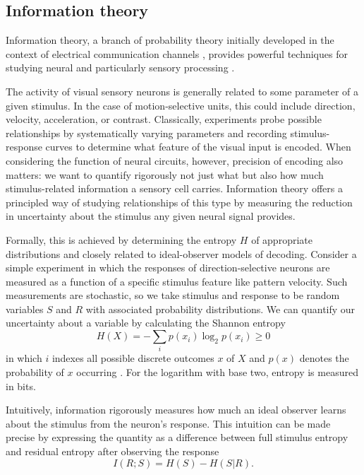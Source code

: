 \subsection{Information theory}

Information theory, a branch of probability theory initially developed in the context of electrical communication channels \citep{Shannon:1948aa}, provides powerful techniques for studying neural and particularly sensory processing \citep{Borst:1999hw}.

The activity of visual sensory neurons is generally related to some parameter of a given stimulus. In the case of motion-selective units, this could include direction, velocity, acceleration, or contrast. Classically, experiments probe possible relationships by systematically varying parameters and recording stimulus-response curves to determine what feature of the visual input is encoded. When considering the function of neural circuits, however, precision of encoding also matters: we want to quantify rigorously not just what but also how much stimulus-related information a sensory cell carries. Information theory offers a principled way of studying relationships of this type by measuring the reduction in uncertainty about the stimulus any given neural signal provides.

Formally, this is achieved by determining the entropy $H$ of appropriate distributions and closely related to ideal-observer models of decoding. Consider a simple experiment in which the responses of direction-selective neurons are measured as a function of a specific stimulus feature like pattern velocity. Such measurements are stochastic, so we take stimulus and response to be random variables $S$ and $R$ with associated probability distributions. We can quantify our uncertainty about a variable by calculating the Shannon entropy
\begin{equation}
    H(X) = - \sum_{i} p(x_i) \log_2 p(x_i) \geq 0
\end{equation}
in which $i$ indexes all possible discrete outcomes $x$ of $X$ and $p(x)$ denotes the probability of $x$ occurring \citep{Cover:2006aa}. For the logarithm with base two, entropy is measured in bits.

Intuitively, information rigorously measures how much an ideal observer learns about the stimulus from the neuron's response. This intuition can be made precise by expressing the quantity as a difference between full stimulus entropy and residual entropy after observing the response
\begin{equation}
    I(R; S) = H(S) - H(S|R).
\end{equation}

